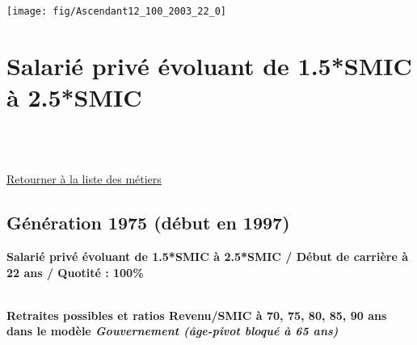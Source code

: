  \vspace{0.1cm} 

 {\hspace{-2.2cm}\texttt{[image: fig/Ascendant12\_100\_2003\_22\_0]}} 

\newpage 
 
\chapter{Salarié privé évoluant de 1.5*SMIC à 2.5*SMIC} 

~\\ 
 


   
 \localtableofcontents 

~\\ 
 
 \hyperlink{page.2}{\noindent Retourner à la liste des métiers}

 \newpage 

\section{Génération 1975 (début en 1997)\label{Ascendant1525_100_1975_22_0}} 
 
{\bf \noindent Salarié privé évoluant de 1.5*SMIC à 2.5*SMIC / Début de carrière à 22 ans / Quotité : 100\%}  ~ 

 ~\\{\bf \noindent Retraites possibles et ratios Revenu/SMIC à 70, 75, 80, 85, 90 ans dans le modèle \emph{Gouvernement (âge-pivot bloqué à 65 ans)}}  
 
